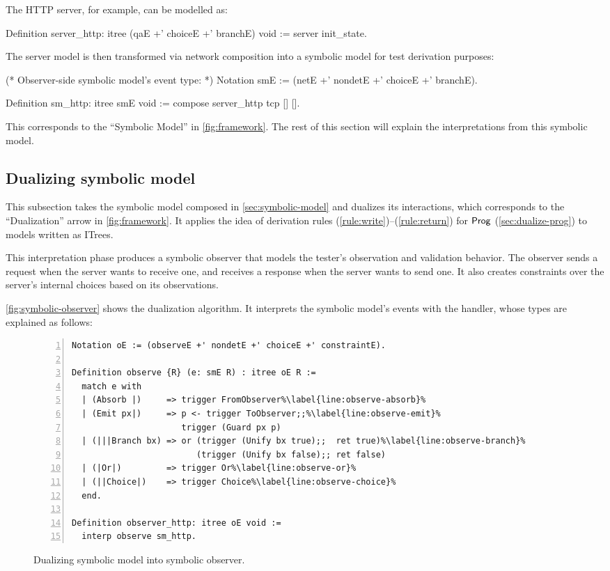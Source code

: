 The HTTP server, for example, can be modelled as:
\begin{coq}
  Definition server_http: itree (qaE +' choiceE +' branchE) void :=
    server init_state.
\end{coq}

The server model is then transformed via network composition into a symbolic
model for test derivation purposes:
\begin{coq}
  (* Observer-side symbolic model's event type: *)
  Notation smE := (netE +' nondetE +' choiceE +' branchE).
  
  Definition sm_http: itree smE void :=
    compose server_http tcp [] [].
\end{coq}

This corresponds to the ``Symbolic Model'' in \autoref{fig:framework}.  The rest
of this section will explain the interpretations from this symbolic model.

\subsection{Dualizing symbolic model}
\label{sec:dualize-interaction}
This subsection takes the symbolic model composed in
\autoref{sec:symbolic-model} and dualizes its interactions, which corresponds
to the ``Dualization'' arrow in \autoref{fig:framework}.  It applies the idea of
derivation rules (\ref{rule:write})--(\ref{rule:return}) for $\mathsf{Prog}$
(\autoref{sec:dualize-prog}) to models written as ITrees.

This interpretation phase produces a symbolic observer that models the tester's
observation and validation behavior.  The observer sends a request when the
server wants to receive one, and receives a response when the server wants to
send one.  It also creates constraints over the server's internal choices based
on its observations.

\autoref{fig:symbolic-observer} shows the dualization algorithm.  It interprets
the symbolic model's events with the  handler, whose types are
explained as follows:

\begin{figure}
\begin{lstlisting}[numbers=left]
Notation oE := (observeE +' nondetE +' choiceE +' constraintE).

Definition observe {R} (e: smE R) : itree oE R :=
  match e with
  | (Absorb |)     => trigger FromObserver%\label{line:observe-absorb}%
  | (Emit px|)     => p <- trigger ToObserver;;%\label{line:observe-emit}%
                      trigger (Guard px p)
  | (|||Branch bx) => or (trigger (Unify bx true);;  ret true)%\label{line:observe-branch}%
                         (trigger (Unify bx false);; ret false)
  | (|Or|)         => trigger Or%\label{line:observe-or}%
  | (||Choice|)    => trigger Choice%\label{line:observe-choice}%
  end.

Definition observer_http: itree oE void :=
  interp observe sm_http.
\end{lstlisting}
\caption{Dualizing symbolic model into symbolic observer.}
\label{fig:symbolic-observer}
\end{figure}

